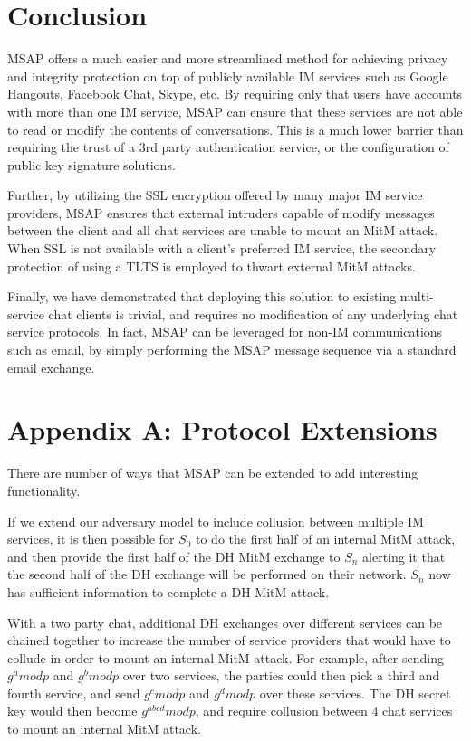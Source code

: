 \documentclass[twoside,10pt]{article}
\begin{document}
\begin{multicols}{2}
\section{Conclusion}
MSAP offers a much easier and more streamlined method for achieving privacy and integrity protection on top of publicly available IM services such as Google Hangouts, Facebook Chat, Skype, etc.  By requiring only that users have accounts with more than one IM service, MSAP can ensure that these services are not able to read or modify the contents of conversations.  This is a much lower barrier than requiring the trust of a 3rd party authentication service, or the configuration of public key signature solutions.

Further, by utilizing the SSL encryption offered by many major IM service providers, MSAP ensures that external intruders capable of modify messages between the client and all chat services are unable to mount an MitM attack.  When SSL is not available with a client's preferred IM service, the secondary protection of using a TLTS is employed to thwart external MitM attacks.

Finally, we have demonstrated that deploying this solution to existing multi-service chat clients is trivial, and requires no modification of any underlying chat service protocols.  In fact, MSAP can be leveraged for non-IM communications such as email, by simply performing the MSAP message sequence via a standard email exchange.

\section{Appendix A: Protocol Extensions}
There are number of ways that MSAP can be extended to add interesting functionality.  

If we extend our adversary model to include collusion between multiple IM services, it is then possible for $S_0$ to do the first half of an internal MitM attack, and then provide the first half of the DH MitM exchange to $S_n$ alerting it that the second half of the DH exchange will be performed on their network.  $S_n$ now has sufficient information to complete a DH MitM attack.

With a two party chat, additional DH exchanges over different services can be chained together to increase the number of service providers that would have to collude in order to mount an internal MitM attack.  For example, after sending $g^a mod p$ and $g^b mod p$ over two services, the parties could then pick a third and fourth service, and send $g^c mod p$ and $g^d mod p$ over these services.  The DH secret key would then become $g^{abcd} mod p$, and require collusion between 4 chat services to mount an internal MitM attack.



\end{multicols}
\end{document}
